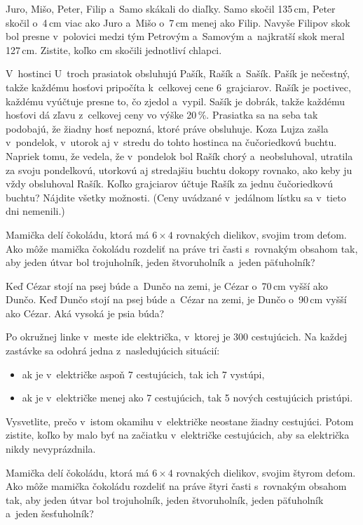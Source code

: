 {%
Juro, Mišo, Peter, Filip a~Samo skákali do diaľky.
Samo skočil 135\,cm,
Peter skočil o~4\,cm viac ako Juro
a~Mišo o~7\,cm menej ako Filip.
Navyše Filipov skok bol presne v~polovici medzi tým Petrovým a~Samovým
a~najkratší skok meral 127\,cm.
Zistite, koľko cm skočili jednotliví chlapci.}

{%
V~hostinci U~troch prasiatok obsluhujú Pašík, Rašík a~Sašík.
Pašík je nečestný, takže každému hosťovi pripočíta
k~celkovej cene 6~grajciarov.
Rašík je poctivec, každému vyúčtuje presne to, čo zjedol a~vypil.
Sašík je dobrák, takže každému hosťovi dá zľavu z~celkovej ceny vo výške
20\,\%.
Prasiatka sa na seba tak podobajú, že žiadny hosť nepozná, ktoré práve obsluhuje.
Koza Lujza zašla v~pondelok, v~utorok aj v~stredu do tohto hostinca na
čučoriedkovú buchtu.
Napriek tomu, že vedela, že v~pondelok bol Rašík chorý
a~neobsluhoval, utratila za svoju pondelkovú, utorkovú aj stredajšiu buchtu
dokopy rovnako, ako keby ju vždy obsluhoval Rašík.
Koľko grajciarov účtuje Rašík za jednu čučoriedkovú buchtu?
Nájdite všetky možnosti.
(Ceny uvádzané v~jedálnom lístku sa v~tieto dni nemenili.)
}

{%
Mamička delí čokoládu, ktorá má $6\times 4$ rovnakých dielikov,
svojim trom deťom.
Ako môže mamička čokoládu rozdeliť na práve tri časti s~rovnakým obsahom
tak, aby jeden útvar bol trojuholník, jeden štvoruholník a~jeden päťuholník?}

{%
Keď Cézar stojí na psej búde a~Dunčo na zemi, je Cézar o~70\,cm vyšší ako
Dunčo.
Keď Dunčo stojí na psej búde a~Cézar na zemi, je Dunčo o~90\,cm vyšší ako
Cézar.
Aká vysoká je psia búda?}

{%
Po okružnej linke v~meste ide električka, v~ktorej je 300 cestujúcich.
Na každej zastávke sa odohrá jedna z~nasledujúcich situácií:
\begin{itemize}
  \item ak je v~električke aspoň 7 cestujúcich, tak ich 7 vystúpi,
  \item ak je v~električke menej ako 7 cestujúcich, tak 5 nových cestujúcich
    pristúpi.
\end{itemize}
\noindent
Vysvetlite, prečo v~istom okamihu v~električke neostane žiadny cestujúci.
Potom zistite, koľko by malo byť na začiatku v~električke cestujúcich,
aby sa električka nikdy nevyprázdnila.
}

{%
Mamička delí čokoládu, ktorá má $6\times 4$ rovnakých dielikov,
svojim štyrom deťom.
Ako môže mamička čokoládu rozdeliť na práve štyri časti s~rovnakým
obsahom tak, aby jeden útvar bol trojuholník, jeden štvoruholník, jeden
päťuholník a~jeden šesťuholník?}

